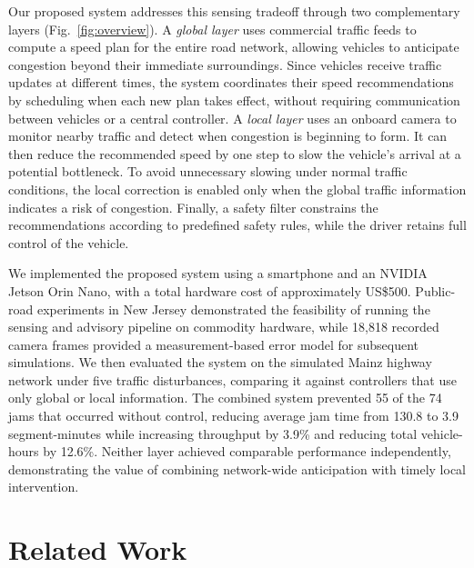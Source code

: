 \documentclass[letterpaper, 10pt, journal, twoside]{IEEEtran}
\begin{document}
Our proposed system addresses this sensing tradeoff through two complementary layers (Fig.~\ref{fig:overview}). A \emph{global layer} uses commercial traffic feeds to compute a speed plan for the entire road network, allowing vehicles to anticipate congestion beyond their immediate surroundings. Since vehicles receive traffic updates at different times, the system coordinates their speed recommendations by scheduling when each new plan takes effect, without requiring communication between vehicles or a central controller. A \emph{local layer} uses an onboard camera to monitor nearby traffic and detect when congestion is beginning to form. It can then reduce the recommended speed by one step to slow the vehicle's arrival at a potential bottleneck. To avoid unnecessary slowing under normal traffic conditions, the local correction is enabled only when the global traffic information indicates a risk of congestion. Finally, a safety filter constrains the recommendations according to predefined safety rules, while the driver retains full control of the vehicle.

We implemented the proposed system using a smartphone and an NVIDIA Jetson Orin Nano, with a total hardware cost of approximately US\$500. Public-road experiments in New Jersey demonstrated the feasibility of running the sensing and advisory pipeline on commodity hardware, while 18,818 recorded camera frames provided a measurement-based error model for subsequent simulations. We then evaluated the system on the simulated Mainz highway network under five traffic disturbances, comparing it against controllers that use only global or local information. The combined system prevented 55 of the 74 jams that occurred without control, reducing average jam time from 130.8 to 3.9 segment-minutes while increasing throughput by 3.9\% and reducing total vehicle-hours by 12.6\%. Neither layer achieved comparable performance independently, demonstrating the value of combining network-wide anticipation with timely local intervention.

\section{Related Work}

\label{sec:related}
\end{document}
